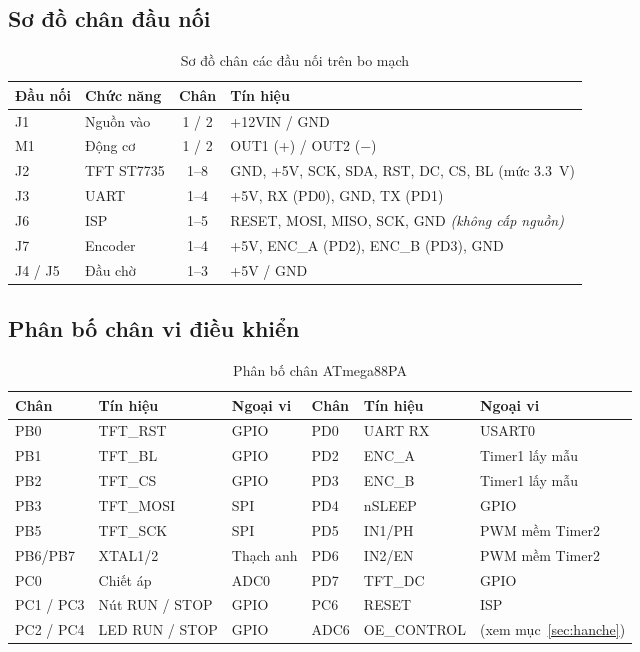 \subsection{Sơ đồ chân đầu nối}
\begin{table}[H]
\centering\small
\caption{Sơ đồ chân các đầu nối trên bo mạch}
\label{tab:connectors}
\begin{tabularx}{\linewidth}{@{}l>{\raggedright\arraybackslash}p{2.8cm}c>{\raggedright\arraybackslash}X@{}}
\toprule
\textbf{Đầu nối} & \textbf{Chức năng} & \textbf{Chân} & \textbf{Tín hiệu}\\
\midrule
J1 & Nguồn vào & 1 / 2 & +12VIN / GND\\
M1 & Động cơ & 1 / 2 & OUT1 (+) / OUT2 ($-$)\\
J2 & TFT ST7735 & 1--8 & GND, +5V, SCK, SDA, RST, DC, CS, BL (mức \SI{3.3}{\volt})\\
J3 & UART & 1--4 & +5V, RX (PD0), GND, TX (PD1)\\
J6 & ISP & 1--5 & RESET, MOSI, MISO, SCK, GND \textit{(không cấp nguồn)}\\
J7 & Encoder & 1--4 & +5V, ENC\_A (PD2), ENC\_B (PD3), GND\\
J4 / J5 & Đầu chờ & 1--3 & +5V / GND\\
\bottomrule
\end{tabularx}
\end{table}

\subsection{Phân bố chân vi điều khiển}
\begin{table}[H]
\centering\small
\caption{Phân bố chân ATmega88PA}
\label{tab:pinmap}
\begin{tabular}{@{}lll|lll@{}}
\toprule
\textbf{Chân} & \textbf{Tín hiệu} & \textbf{Ngoại vi} & \textbf{Chân} & \textbf{Tín hiệu} & \textbf{Ngoại vi}\\
\midrule
PB0 & TFT\_RST & GPIO & PD0 & UART RX & USART0\\
PB1 & TFT\_BL & GPIO & PD2 & ENC\_A & Timer1 lấy mẫu\\
PB2 & TFT\_CS & GPIO & PD3 & ENC\_B & Timer1 lấy mẫu\\
PB3 & TFT\_MOSI & SPI & PD4 & nSLEEP & GPIO\\
PB5 & TFT\_SCK & SPI & PD5 & IN1/PH & PWM mềm Timer2\\
PB6/PB7 & XTAL1/2 & Thạch anh & PD6 & IN2/EN & PWM mềm Timer2\\
PC0 & Chiết áp & ADC0 & PD7 & TFT\_DC & GPIO\\
PC1 / PC3 & Nút RUN / STOP & GPIO & PC6 & RESET & ISP\\
PC2 / PC4 & LED RUN / STOP & GPIO & ADC6 & OE\_CONTROL & (xem mục~\ref{sec:hanche})\\
\bottomrule
\end{tabular}
\end{table}

